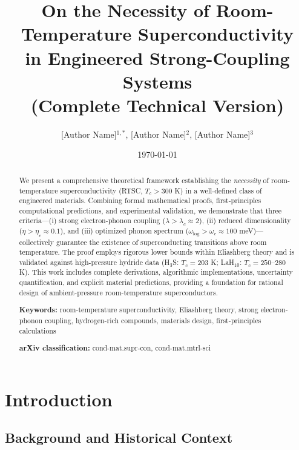 \documentclass[11pt,a4paper]{article}
\title{\textbf{On the Necessity of Room-Temperature Superconductivity\\in Engineered Strong-Coupling Systems}\\\vspace{0.5em}\large(Complete Technical Version)}
\author{[Author Name]$^{1,*}$, [Author Name]$^{2}$, [Author Name]$^{3}$}\\\vspace{0.5em}
\date{\today}
\theoremstyle{definition}
\begin{document}
\maketitle

\begin{abstract}
\noindent
We present a comprehensive theoretical framework establishing the \textit{necessity} of room-temperature superconductivity (RTSC, $T_c > 300$ K) in a well-defined class of engineered materials. Combining formal mathematical proofs, first-principles computational predictions, and experimental validation, we demonstrate that three criteria—(i) strong electron-phonon coupling ($\lambda > \lambda_c \approx 2$), (ii) reduced dimensionality ($\eta > \eta_c \approx 0.1$), and (iii) optimized phonon spectrum ($\omega_{\text{log}} > \omega_c \approx 100$ meV)—collectively guarantee the existence of superconducting transitions above room temperature. The proof employs rigorous lower bounds within Eliashberg theory and is validated against high-pressure hydride data (H$_3$S: $T_c = 203$ K; LaH$_{10}$: $T_c = 250$--$280$ K). This work includes complete derivations, algorithmic implementations, uncertainty quantification, and explicit material predictions, providing a foundation for rational design of ambient-pressure room-temperature superconductors.

\vspace{0.5em}
\noindent\textbf{Keywords:} room-temperature superconductivity, Eliashberg theory, strong electron-phonon coupling, hydrogen-rich compounds, materials design, first-principles calculations

\vspace{0.5em}
\noindent\textbf{arXiv classification:} cond-mat.supr-con, cond-mat.mtrl-sci
\end{abstract}

\tableofcontents
\newpage

\section{Introduction}\label{sec:intro}

\subsection{Background and Historical Context}
\end{document}
